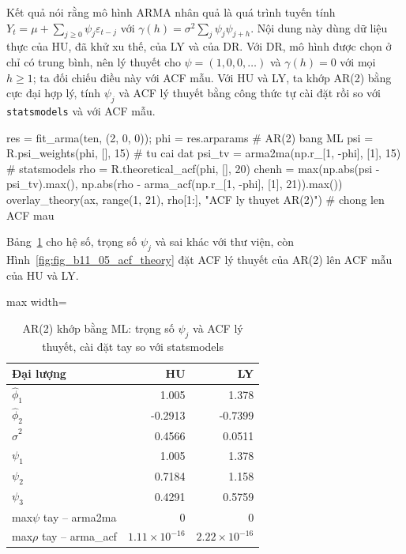  Kết quả  nói rằng mô hình ARMA nhân quả là quá trình tuyến tính $Y_t=\mu+\sum_{j\ge0}\psi_j\varepsilon_{t-j}$ với $\gamma(h)=\sigma^2\sum_j\psi_j\psi_{j+h}$.
 Nội dung này dùng dữ liệu thực của HU, đã khử xu thế, của LY và của DR. Với DR, mô hình được chọn ở  chỉ có trung bình, nên lý thuyết cho $\psi=(1,0,0,\dots)$ và $\gamma(h)=0$ với mọi $h\ge1$; ta đối chiếu điều này với ACF mẫu. Với HU và LY, ta khớp AR(2) bằng cực đại hợp lý, tính $\psi_j$ và ACF lý thuyết bằng công thức tự cài đặt rồi so với \texttt{statsmodels} và với ACF mẫu.
\begin{codeblock}
res = fit_arma(ten, (2, 0, 0)); phi = res.arparams           # AR(2) bang ML
psi = R.psi_weights(phi, [], 15)                              # tu cai dat
psi_tv = arma2ma(np.r_[1, -phi], [1], 15)                     # statsmodels
rho = R.theoretical_acf(phi, [], 20)
chenh = max(np.abs(psi - psi_tv).max(), np.abs(rho - arma_acf(np.r_[1, -phi], [1], 21)).max())
overlay_theory(ax, range(1, 21), rho[1:], "ACF ly thuyet AR(2)")     # chong len ACF mau
\end{codeblock}
 Bảng~\ref{tab:tab_b11_05_psi_acf} cho hệ số, trọng số $\psi_j$ và sai khác với thư viện, còn Hình~\ref{fig:fig_b11_05_acf_theory} đặt ACF lý thuyết của AR(2) lên ACF mẫu của HU và LY.
\begin{table}[H]
\centering\footnotesize
\caption{AR(2) khớp bằng ML: trọng số $\psi_j$ và ACF lý thuyết, cài đặt tay so với statsmodels}\label{tab:tab_b11_05_psi_acf}
\begin{adjustbox}{max width=\linewidth}
\begin{tabular}{|l|r|r|}
\toprule
Đại lượng & HU & LY \\
\midrule
$\hat{\phi}_{1}$ & 1.005 & 1.378 \\
$\hat{\phi}_{2}$ & -0.2913 & -0.7399 \\
$\hat{\sigma}^{2}$ & 0.4566 & 0.0511 \\
$\psi_{1}$ & 1.005 & 1.378 \\
$\psi_{2}$ & 0.7184 & 1.158 \\
$\psi_{3}$ & 0.4291 & 0.5759 \\
max\textbar{}$\psi$ tay – arma2ma\textbar{} & 0 & 0 \\
max\textbar{}$\rho$ tay – arma\_acf\textbar{} & $1.11\times10^{-16}$ & $2.22\times10^{-16}$ \\
\bottomrule
\end{tabular}
\end{adjustbox}
\end{table}
